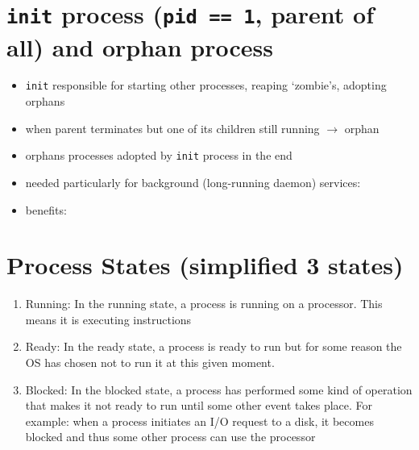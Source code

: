 \section*{\texttt{init} process (\texttt{pid == 1}, parent of all) and orphan process}
\begin{itemize}
\item \texttt{init} responsible for starting other processes, reaping `zombie's, adopting orphans
\item when parent terminates but one of its children still running $\to$ orphan
\item orphans processes adopted by \texttt{init} process in the end
\item needed particularly for background (long-running daemon) services:
\item benefits:
\end{itemize}
\section*{Process States (simplified 3 states)}
\begin{enumerate}
\item Running: In the running state, a process is running on a processor. This means it is executing instructions
\item Ready: In the ready state, a process is ready to run but for some reason the OS has chosen not to run it at this given moment.
\item Blocked: In the blocked state, a process has performed some kind of operation that makes it not ready to run until some other event takes place. For example: when a process initiates an I/O request to a disk, it becomes blocked and thus some other process can use the processor
\end{enumerate}
